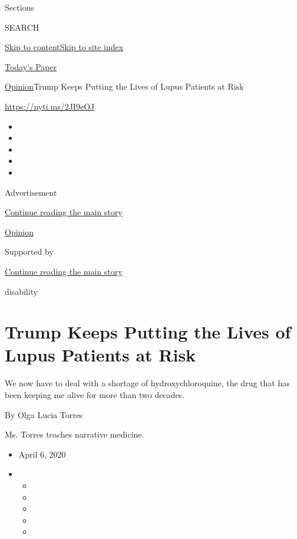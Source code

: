 Sections

SEARCH

\protect\hyperlink{site-content}{Skip to
content}\protect\hyperlink{site-index}{Skip to site index}

\href{https://myaccount.nytimes3xbfgragh.onion/auth/login?response_type=cookie\&client_id=vi}{}

\href{https://www.nytimes3xbfgragh.onion/section/todayspaper}{Today's
Paper}

\href{/section/opinion}{Opinion}\textbar{}Trump Keeps Putting the Lives
of Lupus Patients at Risk

\url{https://nyti.ms/2JI9eOJ}

\begin{itemize}
\item
\item
\item
\item
\item
\end{itemize}

Advertisement

\protect\hyperlink{after-top}{Continue reading the main story}

\href{/section/opinion}{Opinion}

Supported by

\protect\hyperlink{after-sponsor}{Continue reading the main story}

disability

\hypertarget{trump-keeps-putting-the-lives-of-lupus-patients-at-risk}{%
\section{Trump Keeps Putting the Lives of Lupus Patients at
Risk}\label{trump-keeps-putting-the-lives-of-lupus-patients-at-risk}}

We now have to deal with a shortage of hydroxychloroquine, the drug that
has been keeping me alive for more than two decades.

By Olga Lucia Torres

Ms. Torres teaches narrative medicine.

\begin{itemize}
\item
  April 6, 2020
\item
  \begin{itemize}
  \item
  \item
  \item
  \item
  \item
  \end{itemize}
\end{itemize}

